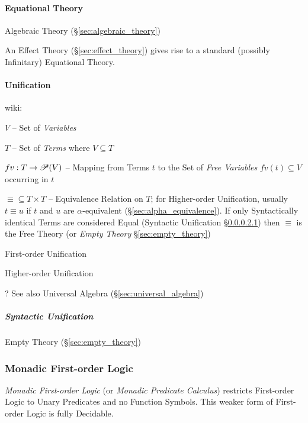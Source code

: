 \paragraph{Equational Theory}\label{sec:equational_theory}\hfill

Algebraic Theory (\S\ref{sec:algebraic_theory})

An Effect Theory (\S\ref{sec:effect_theory}) gives rise to a standard
(possibly Infinitary) Equational Theory. \cite{plotkin-pretnar09}



\paragraph{Unification}\label{sec:unification}\hfill

wiki:

$V$ -- Set of \emph{Variables}

$T$ -- Set of \emph{Terms} where $V \subseteq T$

$fv : T \rightarrow \mathscr{P}(V)$ -- Mapping from Terms $t$ to the Set of
\emph{Free Variables} $fv(t) \subseteq V$ occurring in $t$

$\equiv \subseteq T \times T$ -- Equivalence Relation on $T$; for
Higher-order Unification, usually $t \equiv u$ if $t$ and $u$ are
$\alpha$-equivalent (\S\ref{sec:alpha_equivalence}). If only
Syntactically identical Terms are considered Equal (Syntactic
Unification \S\ref{sec:syntactic_unification}) then $\equiv$ is the
Free Theory (or \emph{Empty Theory} \S\ref{sec:empty_theory})


First-order Unification

Higher-order Unification

\fist ? See also Universal Algebra (\S\ref{sec:universal_algebra})



\subparagraph{Syntactic Unification}\label{sec:syntactic_unification}
\hfill

Empty Theory (\S\ref{sec:empty_theory})



\subsubsection{Monadic First-order Logic}\label{sec:monadic_firstorder}

\emph{Monadic First-order Logic} (or \emph{Monadic Predicate
  Calculus}) restricts First-order Logic to Unary Predicates and no
Function Symbols. This weaker form of First-order Logic is fully
Decidable.



